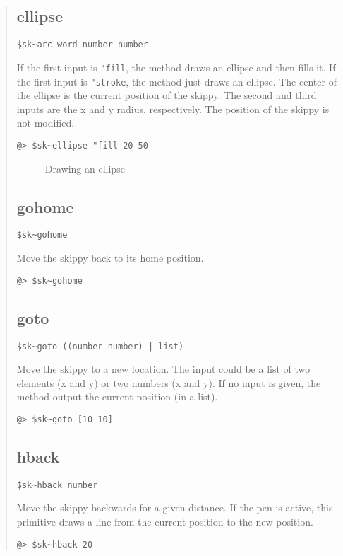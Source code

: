 \documentclass[twoside,10pt,openany]{report}
\newcounter{ex}[chapter]
\newcounter{sc}[chapter]
\newcommand{\screen}[3]{
\begin{figure}[ht!]
\centering
\psfig{figure=images/eps/#2} 
\label{#1}
\caption{#3}
\end{figure}
}
\begin{document}
\begin{quote}
\subsection*{ellipse} 
\begin{verbatim}
$sk~arc word number number
\end{verbatim}
If the first input is {\tt "fill}, the method draws an ellipse and then fills it. If the first input is {\tt "stroke}, the method just draws an ellipse. The center of the ellipse is the current position of the skippy.  The second and third inputs are the x and y radius, respectively. The position of the skippy is not modified.
\begin{verbatim}
@> $sk~ellipse "fill 20 50
\end{verbatim}

\screen{s4}{sk4.eps}{Drawing an ellipse}

\subsection*{gohome} 
\begin{verbatim}
$sk~gohome
\end{verbatim}
Move the skippy back to its home position.
\begin{verbatim}
@> $sk~gohome
\end{verbatim}

\subsection*{goto} 
\begin{verbatim}
$sk~goto ((number number) | list)
\end{verbatim}
Move the skippy to a new location. The input could be a list of two elements (x and y) or two numbers (x and y). If no input is given, the method output the current position (in a list).
\begin{verbatim}
@> $sk~goto [10 10]
\end{verbatim}

\subsection*{hback} 
\begin{verbatim}
$sk~hback number
\end{verbatim}
Move the skippy backwards for a given distance.  If the pen is active, this primitive draws a line from the current position to the new position.
\begin{verbatim}
@> $sk~hback 20
\end{verbatim}


\end{quote}
\end{document}
